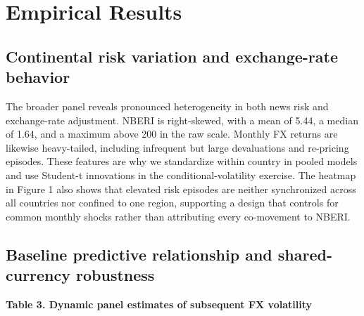 \documentclass[11pt]{article}
\begin{document}
\section{Empirical Results}\label{empirical-results}

\subsection{Continental risk variation and exchange-rate
behavior}\label{continental-risk-variation-and-exchange-rate-behavior}

The broader panel reveals pronounced heterogeneity in both news risk and
exchange-rate adjustment. NBERI is right-skewed, with a mean of 5.44, a
median of 1.64, and a maximum above 200 in the raw scale. Monthly FX
returns are likewise heavy-tailed, including infrequent but large
devaluations and re-pricing episodes. These features are why we
standardize within country in pooled models and use Student-t
innovations in the conditional-volatility exercise. The heatmap in
Figure 1 also shows that elevated risk episodes are neither synchronized
across all countries nor confined to one region, supporting a design
that controls for common monthly shocks rather than attributing every
co-movement to NBERI.

\subsection{Baseline predictive relationship and shared-currency
robustness}\label{baseline-predictive-relationship-and-shared-currency-robustness}

\textbf{Table 3. Dynamic panel estimates of subsequent FX volatility}
\end{document}
